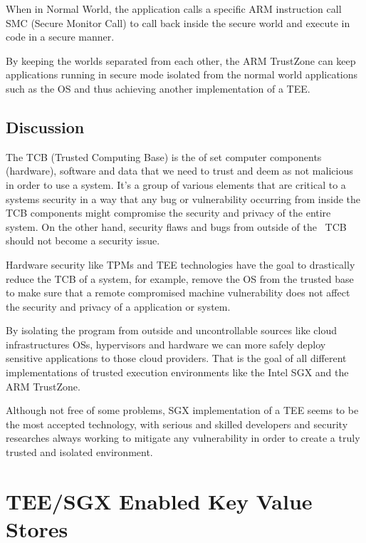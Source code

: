 When in Normal World, the application calls a specific ARM instruction call SMC (Secure Monitor Call) to call back inside the secure world and execute in code in a secure manner.

By keeping the worlds separated from each other, the ARM TrustZone can keep applications running in secure mode isolated from the normal world applications such as the OS and thus achieving another implementation of a \gls{TEE}.

\subsection{Discussion}
\label{ssec:s2_discussion}

The \gls{TCB} (Trusted Computing Base) is the of set computer components (hardware), software and data that we need to trust and deem as not malicious in order to use a system. It's a group of various elements that are critical to a systems security in a way that any bug or vulnerability occurring from inside the \gls{TCB} components might compromise the security and privacy of the entire system. On the other hand, security flaws and bugs from outside of the ~\gls{TCB} should not become a security issue.

Hardware security like \gls{TPM}s and \gls{TEE} technologies have the goal to drastically reduce the \gls{TCB} of a system, for example, remove the \gls{OS} from the trusted base to make sure that a remote compromised machine vulnerability does not affect the security and privacy of a application or system.

By isolating the program from outside and uncontrollable sources like cloud infrastructures \gls{OS}s, hypervisors and hardware we can more safely deploy sensitive applications to those cloud providers.
That is the goal of all different implementations of trusted execution environments like the Intel \gls{SGX} and the ARM TrustZone.

Although not free of some problems, \gls{SGX} implementation of a \gls{TEE} seems to be the most accepted technology, with serious and skilled developers and security researches always working to mitigate any vulnerability in order to create a truly trusted and isolated environment.

\section{TEE/SGX Enabled Key Value Stores} %
\label{sec:sgx_enabled_key_value_stores}

